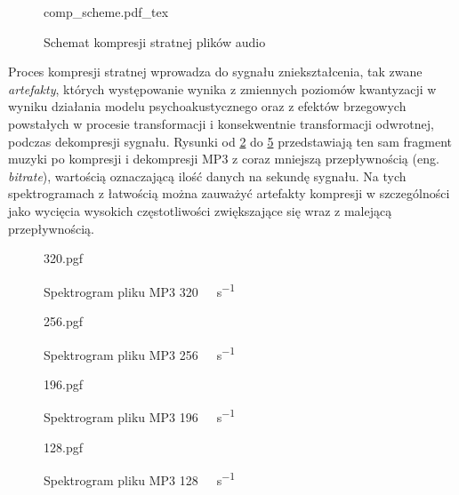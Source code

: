 \documentclass[12pt]{oska}
\begin{document}
\begin{figure}[!tbh]
  \centering
  {comp_scheme.pdf_tex}
  \caption{Schemat kompresji stratnej plików audio}
  \label{fig:comp_scheme}
\end{figure}

Proces kompresji stratnej wprowadza do sygnału zniekształcenia, tak zwane
\textit{artefakty}, których występowanie wynika z zmiennych poziomów
kwantyzacji w wyniku działania modelu psychoakustycznego oraz z efektów
brzegowych powstałych w procesie transformacji i konsekwentnie transformacji
odwrotnej, podczas dekompresji sygnału. Rysunki od \ref{fig:mp3_320} do \ref{fig:mp3_128}
przedstawiają ten sam fragment muzyki po kompresji i dekompresji MP3 z coraz
mniejszą przepływnością (eng. \textit{bitrate}), wartością oznaczającą ilość
danych na sekundę sygnału. Na tych spektrogramach z łatwością można zauważyć
artefakty kompresji w szczególności jako wycięcia wysokich częstotliwości
zwiększające się wraz z malejącą przepływnością.
\begin{figure}[!tbh]
  \centering
  {320.pgf}
  \caption{Spektrogram pliku MP3 \SI{320}{\kilo\bit\per\second}}
  \label{fig:mp3_320}
\end{figure}
\begin{figure}[!tbh]
  \centering
  {256.pgf}
  \caption{Spektrogram pliku MP3 \SI{256}{\kilo\bit\per\second}}
  \label{fig:mp3_256}
\end{figure}
\begin{figure}[!tbh]
  \centering
  {196.pgf}
  \caption{Spektrogram pliku MP3 \SI{196}{\kilo\bit\per\second}}
  \label{fig:mp3_196}
\end{figure}
\begin{figure}[!tbh]
  \centering
  {128.pgf}
  \caption{Spektrogram pliku MP3 \SI{128}{\kilo\bit\per\second}}
  \label{fig:mp3_128}
\end{figure}
\end{document}
